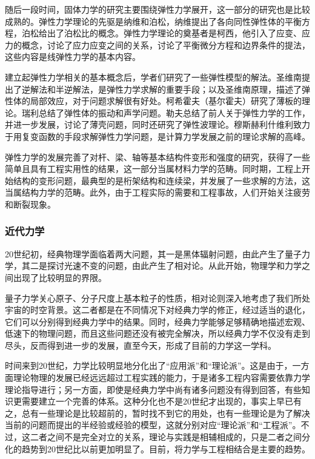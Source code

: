 随后一段时间，固体力学的研究主要围绕弹性力学展开，这一部分的研究也是比较成熟的。弹性力学理论的先驱是纳维和泊松，纳维提出了各向同性弹性体的平衡方程，泊松给出了泊松比的概念。弹性力学理论的奠基者是柯西，他引入了应变、应力的概念，讨论了应力应变之间的关系，讨论了平衡微分方程和边界条件的提法，这些内容是线弹性力学的基本内容。

建立起弹性力学相关的基本概念后，学者们研究了一些弹性模型的解法。圣维南提出了逆解法和半逆解法，是弹性力学求解的重要手段；以及圣维南原理，描述了弹性体的局部效应，对于问题求解很有好处。柯希霍夫（基尔霍夫）研究了薄板的理论。瑞利总结了弹性体的振动和声学问题。勒夫总结了前人关于弹性力学的工作，并进一步发展，讨论了薄壳问题，同时还研究了弹性波理论。穆斯赫利什维利致力于用复变函数的手段求解弹性力学问题，是计算力学发展之前的理论求解的高峰。

弹性力学的发展完善了对杆、梁、轴等基本结构件变形和强度的研究，获得了一些简单且具有工程实用性的结果，这一部分当属材料力学的范畴。同时期，工程上开始结构的变形问题，最典型的是桁架结构和连续梁，并发展了一些求解的方法，这当属结构力学的范畴。此外，由于工程实际的需要和工程事故，人们开始关注疲劳和断裂现象。

\subsubsection{近代力学}

20世纪初，经典物理学面临着两大问题，其一是黑体辐射问题，由此产生了量子力学，其二是探讨光速不变的问题，由此产生了相对论。从此开始，物理学和力学之间出现了比较明显的界限。

量子力学关心原子、分子尺度上基本粒子的性质，相对论则深入地考虑了我们所处宇宙的时空背景。这二者都是在不同情况下对经典力学的修正，经过适当的退化，它们可以分别得到经典力学中的结果。同时，经典力学能够足够精确地描述宏观、低速下的物理问题，而且这些问题还没有被完全解决，所以经典力学不仅没有走到尽头，反而得到进一步的发展，直至今天，形成了目前的力学这一学科。

时间来到20世纪，力学比较明显地分化出了“应用派”和“理论派”。这是由于，一方面理论物理的发展已经远远超过工程实践的能力，于是诸多工程内容需要依靠力学理论指导进行；另一方面，即使是经典力学中尚有诸多问题没有得到回答，有些知识更需要建立一个完善的体系。这种分化也不是20世纪才出现的，事实上早已有之，总有一些理论是比较超前的，暂时找不到它的用处，也有一些理论是为了解决当前的问题而提出的半经验或经验的模型，这就分别对应“理论派”和“工程派”。不过，这二者之间不是完全对立的关系，理论与实践是相辅相成的，只是二者之间分化的趋势到20世纪比以前更加明显了。目前，将力学与工程相结合是主要的趋势。

